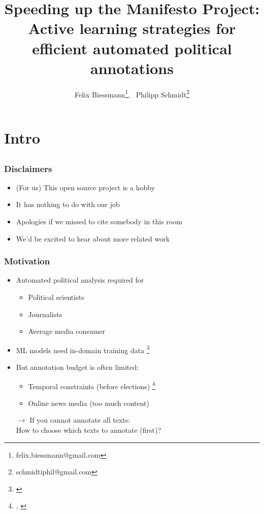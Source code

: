\documentclass[]{beamer}
\institute[]{}
\title[Active Manifesto]{
{
Speeding up the Manifesto Project: \\ Active learning strategies for \\efficient automated political annotations
}}
\author{
Felix Biessmann\thanks{felix.biessmann@gmail.com},~ 
Philipp Schmidt\thanks{schmidtiphil@gmail.com}
}
\date{}
\begin{document}
\begin{frame} 
\titlepage 
\end{frame}	

%
\section{Intro}
\subsection{}

\begin{frame}\frametitle{Disclaimers}
\small
\begin{itemize}
\item (For us) This open source project is a hobby
\item It has nothing to do with our job
\item Apologies if we missed to cite somebody in this room
\item We'd be excited to hear about more related work
\end{itemize}
\end{frame}

\begin{frame}\frametitle{Motivation}
\begin{itemize}[<+->]
\item Automated political analysis required for 
\begin{itemize}
\item Political scientists
\item Journalists
\item Average media consumer
\end{itemize}
\item ML models need in-domain training data \footnote{\cite{Biessmann16}}
\item But annotation budget is often limited:
\begin{itemize}
\item Temporal constraints (before elections) \footnote{\cite{merz2017}, \cite{bronline}}
\item Online news media (too much content) 
\end{itemize}
\item[$\rightarrow$] If you cannot annotate all texts:\\
\centering How to choose which texts to annotate (first)?
\end{itemize}
\end{frame}
\end{document}
